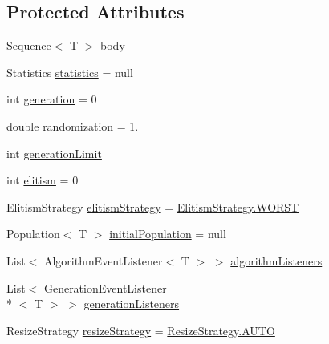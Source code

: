 \subsection*{Protected Attributes}
\begin{DoxyCompactItemize}
\item 
Sequence$<$ T $>$ \hyperlink{classjenes_1_1_genetic_algorithm_3_01_t_01extends_01_chromosome_01_4_a0040f9dbb0018e8bb28dde97dacac7d8}{body}
\item 
Statistics \hyperlink{classjenes_1_1_genetic_algorithm_3_01_t_01extends_01_chromosome_01_4_afc23d5cbab5434f5ec5684cda9434b93}{statistics} = null
\item 
int \hyperlink{classjenes_1_1_genetic_algorithm_3_01_t_01extends_01_chromosome_01_4_ac5a1ddc5e78e2b81c754eb990a91f17b}{generation} = 0
\item 
double \hyperlink{classjenes_1_1_genetic_algorithm_3_01_t_01extends_01_chromosome_01_4_adcb3e16398451c2e318de21d77b51d35}{randomization} = 1.
\item 
int \hyperlink{classjenes_1_1_genetic_algorithm_3_01_t_01extends_01_chromosome_01_4_a6677c80cf6ad470a0124fc2fa3051310}{generation\-Limit}
\item 
int \hyperlink{classjenes_1_1_genetic_algorithm_3_01_t_01extends_01_chromosome_01_4_ac4280b01e7da0ddc049050b19e28b8b9}{elitism} = 0
\item 
Elitism\-Strategy \hyperlink{classjenes_1_1_genetic_algorithm_3_01_t_01extends_01_chromosome_01_4_aacba3e1823ba66a2dd6d3c902f8ff719}{elitism\-Strategy} = \hyperlink{enumjenes_1_1_genetic_algorithm_3_01_t_01extends_01_chromosome_01_4_1_1_elitism_strategy_a60c1acf7a272aca7e29b422a124a2ee2}{Elitism\-Strategy.\-W\-O\-R\-S\-T}
\item 
Population$<$ T $>$ \hyperlink{classjenes_1_1_genetic_algorithm_3_01_t_01extends_01_chromosome_01_4_ab6535da7a5097e18e6305d0f26f7cf5f}{initial\-Population} = null
\item 
List$<$ Algorithm\-Event\-Listener$<$ T $>$ $>$ \hyperlink{classjenes_1_1_genetic_algorithm_3_01_t_01extends_01_chromosome_01_4_a53540867ddd13889614232b3cbea6d6f}{algorithm\-Listeners}
\item 
List$<$ Generation\-Event\-Listener\\*
$<$ T $>$ $>$ \hyperlink{classjenes_1_1_genetic_algorithm_3_01_t_01extends_01_chromosome_01_4_a265c4e10d321e68ae5757abf68d88739}{generation\-Listeners}
\item 
Resize\-Strategy \hyperlink{classjenes_1_1_genetic_algorithm_3_01_t_01extends_01_chromosome_01_4_a56f08a1d1f3355921b83f08745dbb3b3}{resize\-Strategy} = \hyperlink{enumjenes_1_1_genetic_algorithm_3_01_t_01extends_01_chromosome_01_4_1_1_resize_strategy_ab5fbe0d69a54b0b5286d2231726934e5}{Resize\-Strategy.\-A\-U\-T\-O}

\end{DoxyCompactItemize}
